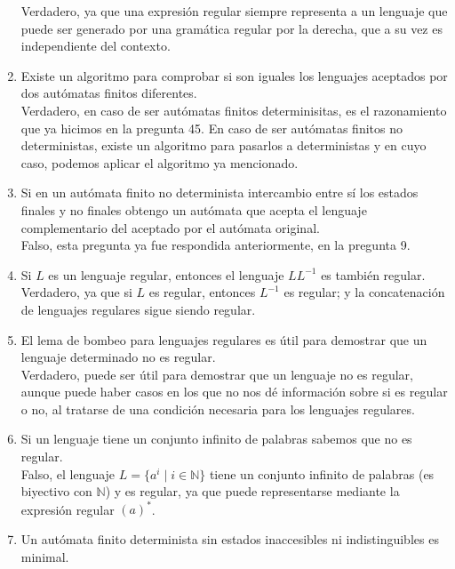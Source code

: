 \begin{enumerate}
        Verdadero, ya que una expresión regular siempre representa a un lenguaje que puede ser generado por una gramática regular por la derecha, que a su vez es independiente del contexto.
    \item Existe un algoritmo para comprobar si son iguales los lenguajes aceptados por dos autómatas finitos diferentes.\\

        Verdadero, en caso de ser autómatas finitos determinisitas, es el razonamiento que ya hicimos en la pregunta 45. En caso de ser autómatas finitos no deterministas, existe un algoritmo para pasarlos a deterministas y en cuyo caso, podemos aplicar el algoritmo ya mencionado.
    \item Si en un autómata finito no determinista intercambio entre sí los estados finales y no finales obtengo un autómata que acepta el lenguaje complementario del aceptado por el autómata original.\\

        Falso, esta pregunta ya fue respondida anteriormente, en la pregunta 9.
    \item Si $L$ es un lenguaje regular, entonces el lenguaje $LL^{-1}$ es también regular.\\

        Verdadero, ya que si $L$ es regular, entonces $L^{-1}$ es regular; y la concatenación de lenguajes regulares sigue siendo regular.
    \item El lema de bombeo para lenguajes regulares es útil para demostrar que un lenguaje determinado no es regular.\\

        Verdadero, puede ser útil para demostrar que un lenguaje no es regular, aunque puede haber casos en los que no nos dé información sobre si es regular o no, al tratarse de una condición necesaria para los lenguajes regulares.
    \item Si un lenguaje tiene un conjunto infinito de palabras sabemos que no es regular.\\

        Falso, el lenguaje $L=\{a^i \mid i \in \mathbb{N}\}$ tiene un conjunto infinito de palabras (es biyectivo con $\mathbb{N}$) y es regular, ya que puede representarse mediante la expresión regular ${(a)}^{\ast}$.
    \item Un autómata finito determinista sin estados inaccesibles ni indistinguibles es minimal.\\


\end{enumerate}
